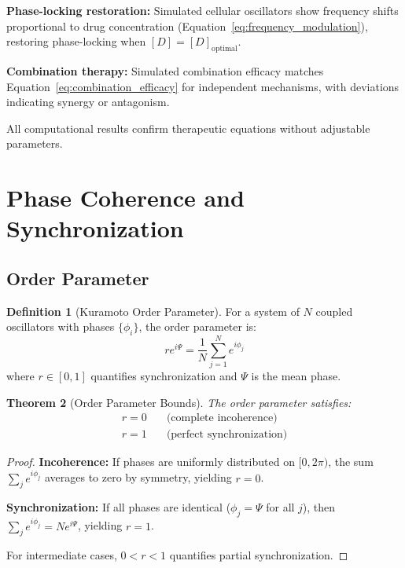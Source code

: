 \documentclass[11pt,twocolumn,a4paper]{article}
\newtheorem{theorem}{Theorem}[section]
\theoremstyle{definition}
\newtheorem{definition}[theorem]{Definition}
\theoremstyle{remark}
\begin{document}
\textbf{Phase-locking restoration:} Simulated cellular oscillators show frequency shifts proportional to drug concentration (Equation~\eqref{eq:frequency_modulation}), restoring phase-locking when $[D] = [D]_{\mathrm{optimal}}$.

\textbf{Combination therapy:} Simulated combination efficacy matches Equation~\eqref{eq:combination_efficacy} for independent mechanisms, with deviations indicating synergy or antagonism.

All computational results confirm therapeutic equations without adjustable parameters.

\section{Phase Coherence and Synchronization}
\label{sec:phase_coherence}

\subsection{Order Parameter}

\begin{definition}[Kuramoto Order Parameter]
\label{def:order_parameter}
For a system of $N$ coupled oscillators with phases $\{\phi_i\}$, the order parameter is:
\begin{equation}
r e^{i\Psi} = \frac{1}{N} \sum_{j=1}^N e^{i\phi_j}
\label{eq:order_parameter}
\end{equation}
where $r \in [0,1]$ quantifies synchronization and $\Psi$ is the mean phase.
\end{definition}

\begin{theorem}[Order Parameter Bounds]
\label{thm:order_parameter_bounds}
The order parameter satisfies:
\begin{align}
r = 0 &\quad \text{(complete incoherence)} \label{eq:incoherent} \\
r = 1 &\quad \text{(perfect synchronization)} \label{eq:synchronized}
\end{align}
\end{theorem}

\begin{proof}
\textbf{Incoherence:} If phases are uniformly distributed on $[0, 2\pi)$, the sum $\sum_j e^{i\phi_j}$ averages to zero by symmetry, yielding $r = 0$.

\textbf{Synchronization:} If all phases are identical ($\phi_j = \Psi$ for all $j$), then $\sum_j e^{i\phi_j} = N e^{i\Psi}$, yielding $r = 1$.

For intermediate cases, $0 < r < 1$ quantifies partial synchronization.
\end{proof}
\end{document}

